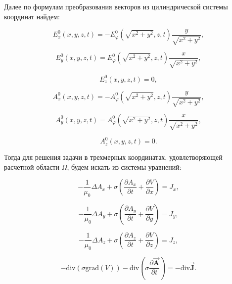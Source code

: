 Далее по формулам преобразования векторов из цилиндрической системы координат найдем:

\begin{equation} \label{eq_1_9}
	E_x^0(x, y, z, t) = -E_{\varphi}^0(\sqrt{x^2 + y^2}, z, t)\frac{y}{\sqrt{x^2 + y^2}},
\end{equation}

\begin{equation} \label{eq_1_10}
	E_y^0(x, y, z, t) = E_{\varphi}^0(\sqrt{x^2 + y^2}, z, t)\frac{x}{\sqrt{x^2 + y^2}},
\end{equation}

\begin{equation} \label{eq_1_11}
	E_z^0(x, y, z, t) = 0,
\end{equation}

\begin{equation} \label{eq_1_12}
	A_x^0(x, y, z, t) = -A_{\varphi}^0(\sqrt{x^2 + y^2}, z, t)\frac{y}{\sqrt{x^2 + y^2}},
\end{equation}

\begin{equation} \label{eq_1_13}
	A_y^0(x, y, z, t) = A_{\varphi}^0(\sqrt{x^2 + y^2}, z, t)\frac{x}{\sqrt{x^2 + y^2}},
\end{equation}

\begin{equation} \label{eq_1_14}
	A_z^0(x, y, z, t) = 0.
\end{equation}

Тогда для решения задачи в трехмерных координатах, удовлетворяющей расчетной области $\Omega$, будем искать из системы уравнений:
 
\begin{equation} \label{eq_1_15}
	-\frac{1}{\mu_0} \Delta A_x + \sigma \left(\frac{\partial A_x}{\partial t} + \frac{\partial V}{\partial x}\right) = J_x,
\end{equation}

\begin{equation} \label{eq_1_16}
	-\frac{1}{\mu_0} \Delta A_y + \sigma \left(\frac{\partial A_y}{\partial t} + \frac{\partial V}{\partial y}\right) = J_y,
\end{equation}

\begin{equation} \label{eq_1_17}
	-\frac{1}{\mu_0} \Delta A_z + \sigma \left(\frac{\partial A_z}{\partial t} + \frac{\partial V}{\partial z}\right) = J_z,
\end{equation}

\begin{equation} \label{eq_1_18}
	-\text{div}(\sigma \text{grad}(V)) - \text{div}\left(\sigma \frac{\partial \overrightarrow{\textbf{A}}}{\partial t}\right) = -\text{div} \overrightarrow{\textbf{J}}.
\end{equation}

